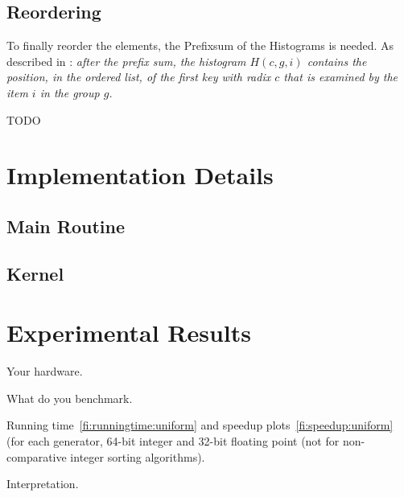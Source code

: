 \documentclass{llncs}
\begin{document}
\subsection{Reordering}
To finally reorder the elements, the Prefixsum of the Histograms is needed. As described in \cite{ocl-radix-helluy}: \textit{after the prefix sum, the histogram $H(c, g, i)$ contains the position, in the ordered list, of the first key with radix $c$ that is examined by the item $i$ in the group $g$.}

TODO

\newpage
\section{Implementation Details}

\subsection{Main Routine}

\subsection{Kernel}

\newpage
\section{Experimental Results}

Your hardware.

What do you benchmark.

Running time~\ref{fi:runningtime:uniform} and speedup plots~\ref{fi:speedup:uniform} (for each generator, 64-bit integer and 32-bit floating point (not for  non-comparative integer sorting algorithms).

Interpretation.
\end{document}
